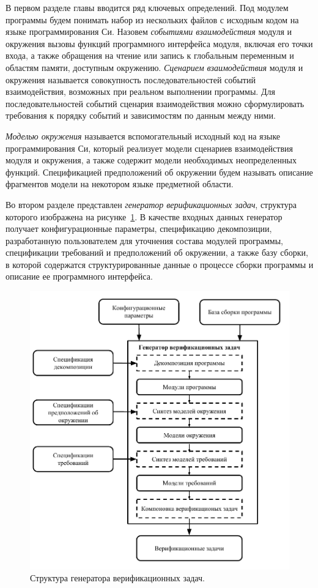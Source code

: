 \documentclass[%
autoref,
colorlinks,  
facsimile,   %
]{disser}
\begin{document}
В первом разделе главы вводится ряд ключевых определений.
Под модулем программы будем понимать набор из нескольких файлов с исходным кодом на языке программирования Си.
Назовем \textit{событиями взаимодействия} модуля и окружения вызовы функций программного интерфейса модуля, включая его точки входа, а также обращения на чтение или запись к глобальным переменным и областям памяти, доступным окружению.
\textit{Сценарием взаимодействия} модуля и окружения называется совокупность последовательностей событий взаимодействия, возможных при реальном выполнении программы.
Для последовательностей событий сценария взаимодействия можно сформулировать требования к порядку событий и зависимостям по данным между ними.

\textit{Моделью окружения} называется вспомогательный исходный код на языке программирования Си, который реализует модели сценариев взаимодействия модуля и окружения, а также содержит модели необходимых неопределенных функций.
Спецификацией предположений об окружении будем называть описание фрагментов модели на некотором языке предметной области.

Во втором разделе представлен \textit{генератор верификационных задач}, структура которого изображена на рисунке~\ref{figure:vt_generator}.
В качестве входных данных генератор получает конфигурационные параметры, спецификацию декомпозиции, разработанную пользователем для уточнения состава модулей программы, спецификации требований и предположений об окружении, а также базу сборки, в которой содержатся структурированные данные о процессе сборки программы и описание ее программного интерфейса.

\begin{figure}
\centering
\includegraphics[scale=0.7]{vt_generator}
\caption{Структура генератора верификационных задач.}
\label{figure:vt_generator}
\end{figure}
\end{document}
